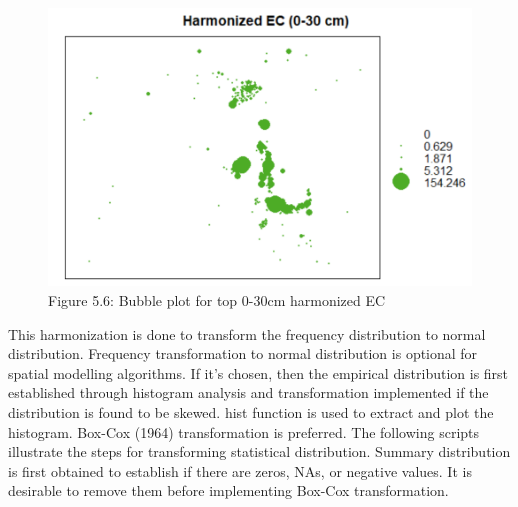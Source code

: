 \documentclass[
  10pt,
  b5paper,
]{book}
\begin{document}
\begin{figure}
\centering
\includegraphics{figures/images/Figure5.6.png}
\caption{Figure 5.6: Bubble plot for top 0-30cm harmonized EC}
\end{figure}

This harmonization is done to transform the frequency distribution to normal distribution. Frequency transformation to normal distribution is optional for spatial modelling algorithms. If it's chosen, then the empirical distribution is first established through histogram analysis and transformation implemented if the distribution is found to be skewed. hist function is used to extract and plot the histogram. Box-Cox (1964) transformation is preferred. The following scripts illustrate the steps for transforming statistical distribution. Summary distribution is first obtained to establish if there are zeros, NAs, or negative values. It is desirable to remove them before implementing Box-Cox transformation.
\end{document}
